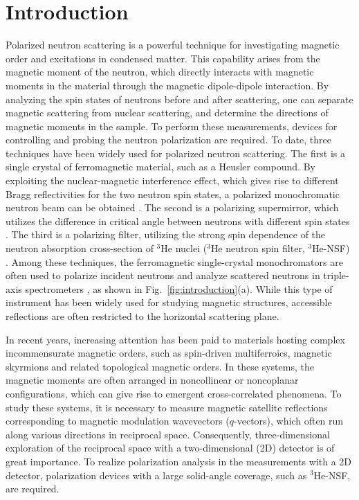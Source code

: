 \documentclass[%
 reprint,
superscriptaddress,
 amsmath,amssymb,
 aps,
floatfix,
]{revtex4-2}
\newcommand{\He}{$^3$He }
\newcommand{\Hensf}{$^3$He-NSF}
\begin{document}
\section{Introduction}
Polarized neutron scattering is a powerful technique for investigating magnetic order and excitations in condensed matter.
This capability arises from the magnetic moment of the neutron, which directly interacts with magnetic moments in the material through the magnetic dipole-dipole interaction.
By analyzing the spin states of neutrons before and after scattering, one can separate magnetic scattering from nuclear scattering, and determine the directions of magnetic moments in the sample.
To perform these measurements, devices for controlling and probing the neutron polarization are required.
To date, three techniques have been widely used for polarized neutron scattering.
The first is a single crystal of ferromagnetic material, such as a  Heusler compound.
By exploiting the nuclear-magnetic interference effect, which gives rise to different Bragg reflectivities for the two neutron spin states, a polarized monochromatic neutron beam can be obtained \cite{squires1996introduction}.
The second is a polarizing supermirror, which utilizes the difference in critical angle between neutrons with different spin states \cite{mezei1976novel}.
The third is a polarizing filter, utilizing the strong spin dependence of the neutron absorption cross-section of \He nuclei (\He neutron spin filter, \Hensf) \cite{gentile2017optically}.
Among these techniques, the ferromagnetic single-crystal monochromators are often used to polarize incident neutrons and analyze scattered neutrons in triple-axis spectrometers \cite{kulda_in20_2002,faulhaber_polarized_2010,fernandez-baca_triple-axis_2008,takeda_double_2008,nakajima_polarized_2024}, as shown in Fig.~\ref{fig:introduction}(a).
While this type of instrument has been widely used for studying magnetic structures, accessible reflections are often restricted to the horizontal scattering plane.

In recent years, increasing attention has been paid to materials hosting complex incommensurate magnetic orders, such as spin-driven multiferroics, magnetic skyrmions and related topological magnetic orders\cite{muhlbauer_skyrmion_2009,tokura_multiferroics_2014,kanazawa_direct_2020,fujishiro_topological_2019,kurumaji_electronic_2025}.
In these systems, the magnetic moments are often arranged in noncollinear or noncoplanar configurations, which can give rise to emergent cross-correlated phenomena.
To study these systems, it is necessary to measure magnetic satellite reflections corresponding to magnetic modulation wavevectors ($q$-vectors), which often run along various directions in reciprocal space.
Consequently, three-dimensional exploration of the reciprocal space with a two-dimensional (2D) detector is of great importance.
To realize polarization analysis in the measurements with a 2D detector, polarization devices with a large solid-angle coverage, such as \Hensf, are required.
\end{document}

